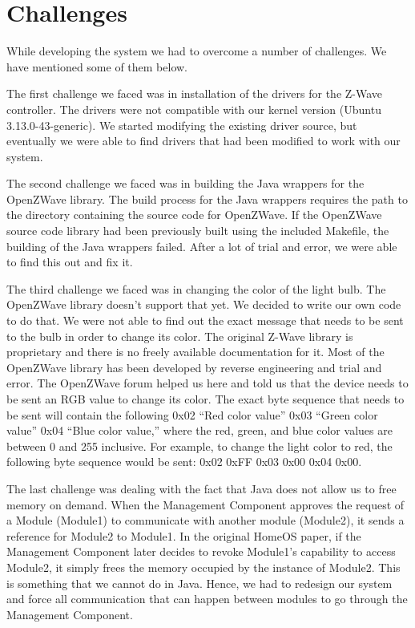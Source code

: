 \section{Challenges}
\label{sec:challenges}
While developing the system we had to overcome a number of challenges. We have 
mentioned some of them below.

The first challenge we faced was in installation of the drivers for the Z-Wave
controller. The drivers were not compatible with our kernel version (Ubuntu 
3.13.0-43-generic). We started modifying the existing driver source, but 
eventually we were able to find drivers that had been modified to work with our
system.

The second challenge we faced was in building the Java wrappers for the
OpenZWave library. The build process for the Java wrappers requires the path to
the directory containing the source code for OpenZWave. If the OpenZWave
source code library had been previously built using the included Makefile, the
building of the Java wrappers failed. After a lot of trial and error, we were
able to find this out and fix it.

The third challenge we faced was in changing the color of the light bulb. The
OpenZWave library doesn't support that yet. We decided to write our own code to
do that. We were not able to find out the exact message that needs to be sent to
the bulb in order to change its color. The original Z-Wave library is
proprietary and there is no freely available documentation for it. Most of the 
OpenZWave library has been developed by reverse engineering and trial and error.
The OpenZWave forum helped us here and told us that the device needs to be sent
an RGB value to change its color. The exact byte sequence that needs to be sent
will contain the following 0x02 ``Red color value'' 0x03 ``Green color value''
0x04 ``Blue color value,'' where the red, green, and blue color values are
between 0 and 255 inclusive. For example, to change the light color to red, the
following byte sequence would be sent: 0x02 0xFF 0x03 0x00 0x04 0x00.

The last challenge was dealing with the fact that Java does not allow us to free
memory on demand. When the Management Component approves the request of a Module
(Module1) to communicate with another module (Module2), it sends a reference for
Module2 to Module1. In the original HomeOS paper, if the Management Component
later decides to revoke Module1's capability to access Module2, it simply frees
the memory occupied by the instance of Module2. This is something that we
cannot do in Java. Hence, we had to redesign our system and force all
communication that can happen between modules to go through the
Management Component.
